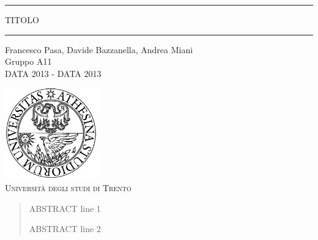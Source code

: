 \begin{titlepage}
\begin{center}

	\hrule \vspace{0.5cm}
     	\textsc{\LARGE TITOLO}
	\vspace{0.5cm} \hrule \vspace{2cm}

      	{\large Francesco Pasa, Davide Bazzanella, Andrea Miani\\
		Gruppo A11}\\
	\vspace{0.5cm}
      	{\large DATA 2013 - DATA 2013}
	\vfill

	\includegraphics[width=4cm]{unitn_logo.png}\\
	\vspace{1cm}
        \textsc{\Large Università degli studi di Trento}
	\vfill

	{\begin{abstract}
ABSTRACT line 1

ABSTRACT line 2
	 \end{abstract}}
\end{center}
\end{titlepage}
